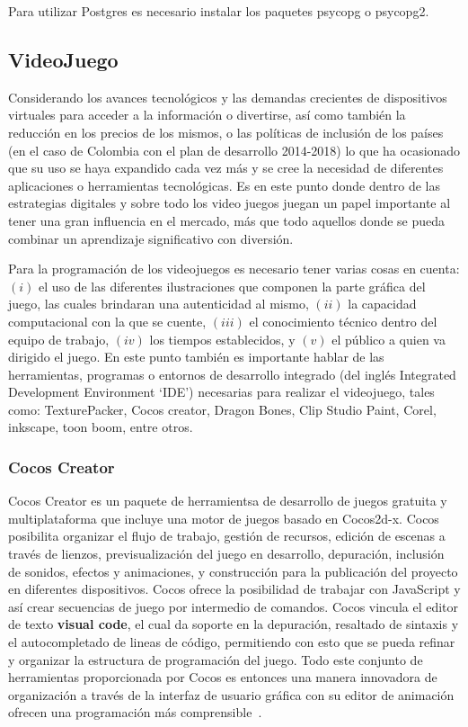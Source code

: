 \documentclass[journal,transmag]{IEEEtran}
\begin{document}
Para utilizar Postgres es necesario instalar los paquetes psycopg o psycopg2.

\subsection{VideoJuego}\label{videojuego}
Considerando los avances tecnológicos y las demandas crecientes de dispositivos virtuales para acceder a la información o divertirse, así como también la reducción en los precios de los mismos, o las políticas de inclusión de los países (en el caso de Colombia con el plan de desarrollo 2014-2018) lo que ha ocasionado que su uso se haya expandido cada vez más y se cree la necesidad de diferentes aplicaciones o herramientas tecnológicas. Es en este punto donde dentro de las estrategias digitales y sobre todo los video juegos juegan un papel importante al tener una gran influencia en el mercado, más que todo aquellos donde se pueda combinar un aprendizaje significativo con diversión.

Para la programación de los videojuegos es necesario tener varias cosas en cuenta: $(i)$ el uso de las diferentes ilustraciones que componen la parte gráfica del juego, las cuales brindaran una autenticidad al mismo, $(ii)$ la capacidad computacional con la que se cuente, $(iii)$ el conocimiento técnico dentro del equipo de trabajo, $(iv)$ los tiempos establecidos, y $(v)$ el público a quien va dirigido el juego. En este punto también es importante hablar de las herramientas, programas o entornos de desarrollo integrado (del inglés Integrated Development Environment `IDE') necesarias para realizar el videojuego, tales como: TexturePacker, Cocos creator, Dragon Bones, Clip Studio Paint, Corel, inkscape, toon boom, entre otros.

\subsubsection{Cocos Creator}
Cocos Creator es un paquete de herramientsa de desarrollo de juegos gratuita y multiplataforma que incluye una motor de juegos basado en Cocos2d-x. Cocos posibilita organizar el flujo de trabajo, gestión de recursos, edición de escenas a través de lienzos, previsualización del juego en desarrollo, depuración, inclusión de sonidos, efectos y animaciones, y construcción para la publicación del proyecto en diferentes dispositivos. Cocos ofrece la posibilidad de trabajar con JavaScript y así crear secuencias de juego por intermedio de comandos. Cocos vincula el editor de texto \textbf{visual code}, el cual da soporte en la depuración, resaltado de sintaxis y el autocompletado de lineas de código, permitiendo con esto que se pueda refinar y organizar la estructura de programación del juego. Todo este conjunto de herramientas proporcionada por Cocos es entonces una manera innovadora de organización a través de la interfaz de usuario gráfica con su editor de animación ofrecen una programación más comprensible~\cite{Cocos}.
\end{document}

